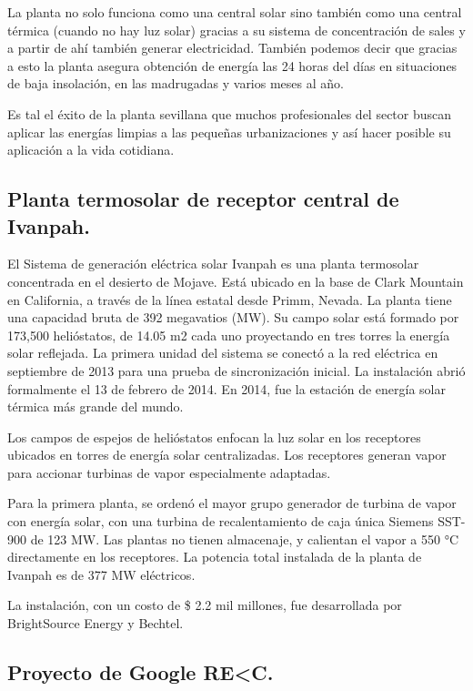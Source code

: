 La planta no solo funciona como una central solar sino también como una central térmica (cuando no hay luz solar) gracias a su sistema de concentración de sales y a partir de ahí también generar electricidad. También podemos decir que gracias a esto la planta asegura obtención de energía las 24 horas del días en situaciones de baja insolación, en las madrugadas y varios meses al año.

Es tal el éxito de la planta sevillana que muchos profesionales del sector buscan aplicar las energías limpias a las pequeñas urbanizaciones y así hacer posible su aplicación a la vida cotidiana. \cite{PonsWebSite}



\subsection{Planta termosolar de receptor central de Ivanpah.}

El Sistema de generación eléctrica solar Ivanpah es una planta termosolar concentrada en el desierto de Mojave. Está ubicado en la base de Clark Mountain en California, a través de la línea estatal desde Primm, Nevada. La planta tiene una capacidad bruta de 392 megavatios (MW). Su campo solar está formado por 173,500 helióstatos, de 14.05 m2 cada uno proyectando en tres torres la energía solar reflejada. La primera unidad del sistema se conectó a la red eléctrica en septiembre de 2013 para una prueba de sincronización inicial. La instalación abrió formalmente el 13 de febrero de 2014. En 2014, fue la estación de energía solar térmica más grande del mundo.
 
Los campos de espejos de helióstatos enfocan la luz solar en los receptores ubicados en torres de energía solar centralizadas. Los receptores generan vapor para accionar turbinas de vapor especialmente adaptadas.
 
Para la primera planta, se ordenó el mayor grupo generador de turbina de vapor con energía solar, con una turbina de recalentamiento de caja única Siemens SST-900 de 123 MW. Las plantas no tienen almacenaje, y calientan el vapor a 550 °C directamente en los receptores. La potencia total instalada de la planta de Ivanpah es de 377 MW eléctricos.
 
La instalación, con un costo de \$ 2.2 mil millones, fue desarrollada por BrightSource Energy y Bechtel. \cite{Wikipedia2WebSite}



\subsection{Proyecto de Google RE\textless C.}

